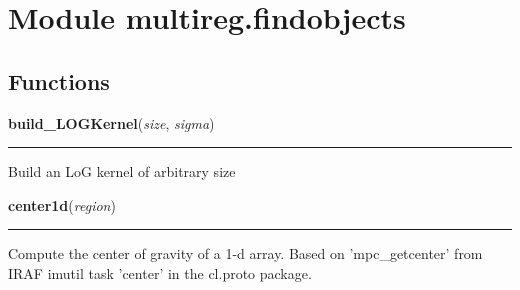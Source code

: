 %
%
%


\section{Module multireg.findobjects}

    \label{multireg:findobjects}


  \subsection{Functions}

    \label{multireg:findobjects:build_LOGKernel}
    \vspace{0.5ex}

    \begin{boxedminipage}{\textwidth}

    \raggedright \textbf{build\_LOGKernel}(\textit{size}, \textit{sigma})

    \vspace{-1.5ex}

    \rule{\textwidth}{0.5\fboxrule}
    Build an LoG kernel of arbitrary size

    \vspace{1ex}

    \end{boxedminipage}

    \label{multireg:findobjects:center1d}
    \vspace{0.5ex}

    \begin{boxedminipage}{\textwidth}

    \raggedright \textbf{center1d}(\textit{region})

    \vspace{-1.5ex}

    \rule{\textwidth}{0.5\fboxrule}
    Compute the center of gravity of a 1-d array. Based on 
    'mpc\_getcenter' from IRAF imutil task 'center' in the cl.proto 
    package.

    \vspace{1ex}

    \end{boxedminipage}

